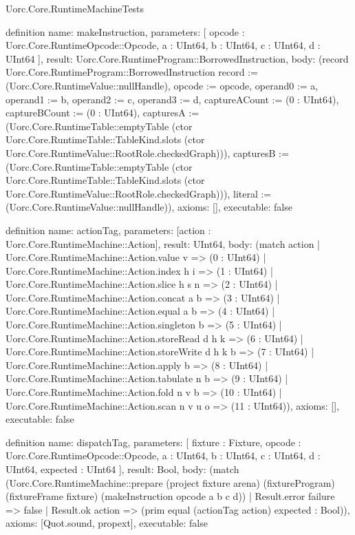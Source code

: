 \begin{lexlean}{Uorc.Core.RuntimeMachineTests}
\begin{semanticmodule}
definition{
  name: makeInstruction,
  parameters: [
    opcode : Uorc.Core.RuntimeOpcode::Opcode,
    a : UInt64,
    b : UInt64,
    c : UInt64,
    d : UInt64
  ],
  result: Uorc.Core.RuntimeProgram::BorrowedInstruction,
  body: (record Uorc.Core.RuntimeProgram::BorrowedInstruction {record := (Uorc.Core.RuntimeValue::nullHandle), opcode := opcode, operand0 := a, operand1 := b, operand2 := c, operand3 := d, captureACount := (0 : UInt64), captureBCount := (0 : UInt64), capturesA := (Uorc.Core.RuntimeTable::emptyTable (ctor Uorc.Core.RuntimeTable::TableKind.slots (ctor Uorc.Core.RuntimeValue::RootRole.checkedGraph))), capturesB := (Uorc.Core.RuntimeTable::emptyTable (ctor Uorc.Core.RuntimeTable::TableKind.slots (ctor Uorc.Core.RuntimeValue::RootRole.checkedGraph))), literal := (Uorc.Core.RuntimeValue::nullHandle)}),
  axioms: [],
  executable: false
}

definition{
  name: actionTag,
  parameters: [action : Uorc.Core.RuntimeMachine::Action],
  result: UInt64,
  body: (match action
    | Uorc.Core.RuntimeMachine::Action.value v => (0 : UInt64)
    | Uorc.Core.RuntimeMachine::Action.index h i => (1 : UInt64)
    | Uorc.Core.RuntimeMachine::Action.slice h s n => (2 : UInt64)
    | Uorc.Core.RuntimeMachine::Action.concat a b => (3 : UInt64)
    | Uorc.Core.RuntimeMachine::Action.equal a b => (4 : UInt64)
    | Uorc.Core.RuntimeMachine::Action.singleton b => (5 : UInt64)
    | Uorc.Core.RuntimeMachine::Action.storeRead d h k => (6 : UInt64)
    | Uorc.Core.RuntimeMachine::Action.storeWrite d h k b => (7 : UInt64)
    | Uorc.Core.RuntimeMachine::Action.apply b => (8 : UInt64)
    | Uorc.Core.RuntimeMachine::Action.tabulate n b => (9 : UInt64)
    | Uorc.Core.RuntimeMachine::Action.fold n v b => (10 : UInt64)
    | Uorc.Core.RuntimeMachine::Action.scan n v u o => (11 : UInt64)),
  axioms: [],
  executable: false
}

definition{
  name: dispatchTag,
  parameters: [
    fixture : Fixture,
    opcode : Uorc.Core.RuntimeOpcode::Opcode,
    a : UInt64,
    b : UInt64,
    c : UInt64,
    d : UInt64,
    expected : UInt64
  ],
  result: Bool,
  body: (match (Uorc.Core.RuntimeMachine::prepare (project fixture arena) (fixtureProgram) (fixtureFrame fixture) (makeInstruction opcode a b c d))
    | Result.error failure => false
    | Result.ok action => (prim equal (actionTag action) expected : Bool)),
  axioms: [Quot.sound, propext],
  executable: false
}


\end{semanticmodule}
\end{lexlean}
